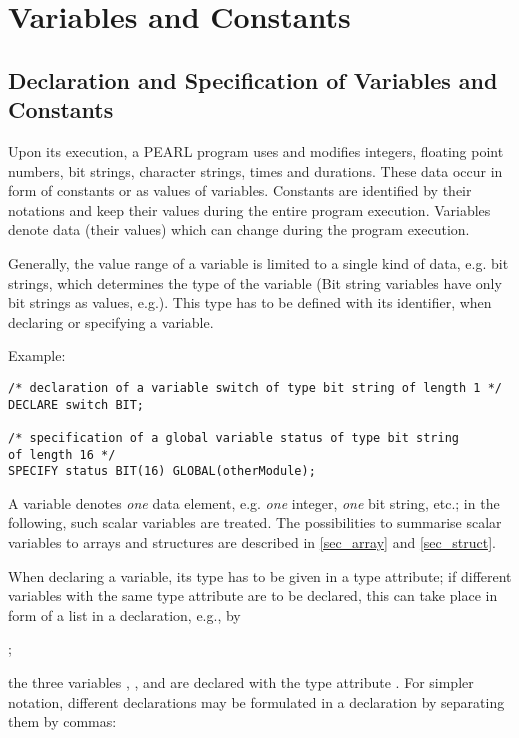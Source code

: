 \chapter{Variables and Constants}  %
\label{sec_variables}

\section{Declaration and Specification of Variables and Constants}  %

Upon its execution, a PEARL program uses and modifies integers, floating
point numbers, bit strings, character strings, times and durations.
These data occur in form of constants or as values of variables.
Constants are identified by their notations and keep their values during
the entire program execution. Variables denote data (their values) which
can change during the program execution.

Generally, the value range of a variable is limited to a single kind of data,
e.g. bit strings, which determines the type of the variable (Bit string
variables have only bit strings as values, e.g.). This type has to be
defined with its identifier, when declaring or specifying a
variable.

Example:

\begin{lstlisting}
/* declaration of a variable switch of type bit string of length 1 */ 
DECLARE switch BIT;

/* specification of a global variable status of type bit string 
of length 16 */ 
SPECIFY status BIT(16) GLOBAL(otherModule);
\end{lstlisting}

A variable denotes {\it one} data element, e.g. {\it one} integer, {\it
one} bit string, etc.; in the following, such scalar variables are
treated. The possibilities to summarise scalar variables to arrays and
structures are described in \ref{sec_array} and \ref{sec_struct}.

When declaring a variable, its type has to be given in a type attribute;
if different variables with the same type attribute are to be declared,
this can take place in form of a list in a declaration, e.g., by

  ;

the three variables , , and  are
 declared with the type attribute
.  For simpler notation, different declarations may be formulated
in a declaration by separating them by commas:

